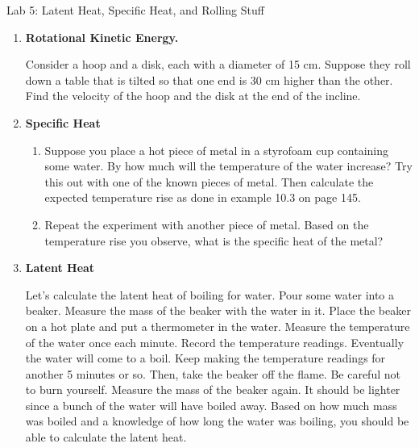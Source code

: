 
\oddsidemargin=0in
\textwidth=6.75in

\renewcommand{\arraystretch}{1.3}


\pagestyle{empty}

\begin{center}
{\large Lab 5:  Latent Heat, Specific Heat, and Rolling Stuff}\\
\end{center}
\bigskip

\begin{enumerate}

\item {\bf Rotational Kinetic Energy.} 

Consider a hoop and a disk, each with a diameter of 15 cm.  Suppose
they roll down a table that is tilted so that one end is 30 cm higher
than the other.  Find the velocity of the hoop and the disk at the
end of the incline.


\item {\bf Specific Heat}

\begin{enumerate}

\item Suppose you place a hot piece of metal in a styrofoam cup
containing some water. By how much will the temperature of the water
increase?  Try this out with one of the known pieces of metal.  Then
calculate the expected temperature rise as done in example 10.3 on
page 145.  


\item Repeat the experiment with another piece of metal.  Based on the
temperature rise you observe, what is the specific heat of the metal?  


\end{enumerate}


\item {\bf Latent Heat}

Let's calculate the latent heat of boiling for water.  Pour some
water into a beaker.  Measure the mass of the beaker with the water in
it.  Place the beaker on a hot plate and put a thermometer in the
water.  Measure the temperature of the water once each minute.  Record
the temperature readings.  Eventually the water will come to a boil.
Keep making the temperature readings for another 5 minutes or so.
Then, take the beaker off the flame.  Be careful not to burn
yourself.  Measure the mass of the beaker again.  It should be lighter
since a bunch of the water will have boiled away.  Based on how much
mass was boiled and a knowledge of how long the water was boiling, you
should be able to calculate the latent heat.


\end{enumerate}



